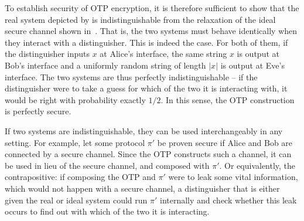 To establish security of OTP encryption, it is therefore sufficient to
show that the real system depicted by  is
indistinguishable from the relaxation of the ideal secure channel shown in~. That is, the two systems must behave
identically when they interact with a distinguisher.  This is indeed
the case. For both of them, if the distinguisher inputs $x$ at Alice's
interface, the same string $x$ is output at Bob's interface and a
uniformly random string of length $|x|$ is output at Eve's
interface. The two systems are thus perfectly indistinguishable \---
if the distinguisher were to take a guess for which of the two it is interacting with, it would be right with
probability exactly $1/2$. In this sense, the OTP construction is
perfectly secure.

If two systems are indistinguishable, they can be used interchangeably in any setting. For example, let some protocol $\pi'$ be proven secure if Alice and Bob are connected by a secure channel. Since the OTP constructs such a channel, it can be used in lieu of the secure channel, and composed with $\pi'$. Or equivalently, the contrapositive: if composing the OTP and $\pi'$ were to leak some vital information, which would not happen with a secure channel, a distinguisher that is either given the real or ideal system could run $\pi'$ internally and check whether this leak occurs to find out with which of the two it is interacting.








